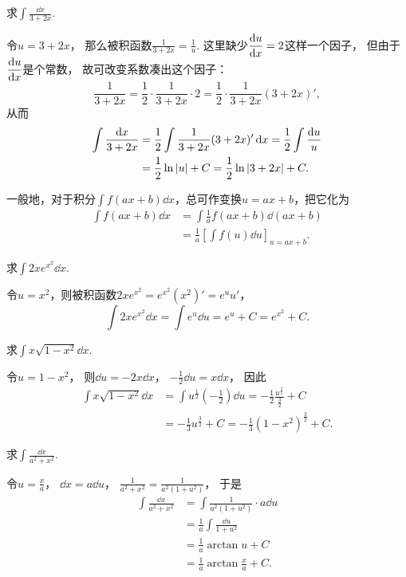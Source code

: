 \begin{example}
求\(\int \frac{\dd{x}}{3+2x}\).
\begin{solution}
令\(u = 3+2x\)，
那么被积函数\(\frac{1}{3+2x} = \frac{1}{u}\).
这里缺少\(\displaystyle\dv{u}{x}=2\)这样一个因子，
但由于\(\displaystyle\dv{u}{x}\)是个常数，
故可改变系数凑出这个因子：\[
	\frac{1}{3+2x}
	= \frac{1}{2} \cdot \frac{1}{3+2x} \cdot 2
	= \frac{1}{2} \cdot \frac{1}{3+2x} (3+2x)',
\]
从而\begin{align*}
	\int \frac{\dd{x}}{3+2x}
	&= \frac{1}{2} \int \frac{1}{3+2x} (3+2x)' \dd{x}
	= \frac{1}{2} \int \frac{\dd{u}}{u} \\
	&= \frac{1}{2} \ln\abs{u} + C
	= \frac{1}{2} \ln\abs{3+2x} + C.
\end{align*}
\end{solution}
\end{example}

一般地，对于积分\(\int f(ax+b) \dd{x}\)，总可作变换\(u=ax+b\)，把它化为\begin{align*}
\int f(ax+b) \dd{x}
&= \int \frac{1}{a} f(ax+b) \dd(ax+b) \\
&= \frac{1}{a} \left[ \int f(u) \dd{u} \right]_{u=ax+b}.
\end{align*}

\begin{example}
求\(\int 2x e^{x^2} \dd{x}\).
\begin{solution}
令\(u=x^2\)，则被积函数\(2x e^{x^2} = e^{x^2} (x^2)' = e^u u'\)，\[
\int 2x e^{x^2} \dd{x}
= \int e^u \dd{u}
= e^u + C
= e^{x^2} + C.
\]
\end{solution}
\end{example}

\begin{example}
求\(\int x \sqrt{1-x^2} \dd{x}\).
\begin{solution}
令\(u=1-x^2\)，
则\(\dd{u} = -2x\dd{x}\)，
\(-\frac{1}{2}\dd{u} = x\dd{x}\)，
因此\begin{align*}
	\int x \sqrt{1-x^2} \dd{x}
	&= \int u^{\frac{1}{2}} \left(-\frac{1}{2}\right) \dd{u}
	= -\frac{1}{2} \frac{u^{\frac{3}{2}}}{\frac{3}{2}} + C \\
	&= -\frac{1}{3} u^{\frac{3}{2}} + C
	= -\frac{1}{3} (1-x^2)^{\frac{3}{2}} + C.
\end{align*}
\end{solution}
\end{example}

\begin{example}
求\(\int \frac{\dd{x}}{a^2+x^2}\).
\begin{solution}
令\(u=\frac{x}{a}\)，
\(\dd{x}=a\dd{u}\)，
\(\frac{1}{a^2+x^2}
= \frac{1}{a^2(1+u^2)}\)，
于是\begin{align}
	\int \frac{\dd{x}}{a^2+x^2}
	&= \int \frac{1}{a^2(1+u^2)} \cdot a\dd{u}
		\nonumber \\
	&= \frac{1}{a} \int \frac{\dd{u}}{1+u^2}
		\nonumber \\
	&= \frac{1}{a} \arctan u + C
		\nonumber \\
	&= \frac{1}{a} \arctan\frac{x}{a} + C.
\end{align}
\end{solution}
\end{example}

